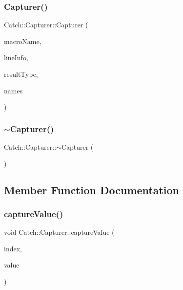 \subsubsection{Capturer()}
{\footnotesize\ttfamily Catch\+::\+Capturer\+::\+Capturer (\begin{DoxyParamCaption}\item[{\textbf{ String\+Ref}}]{macro\+Name,  }\item[{\textbf{ Source\+Line\+Info} const \&}]{line\+Info,  }\item[{\textbf{ Result\+Was\+::\+Of\+Type}}]{result\+Type,  }\item[{\textbf{ String\+Ref}}]{names }\end{DoxyParamCaption})}

\mbox{\label{class_catch_1_1_capturer_aecde85cf69e65565cec91e325a657b82}} 
\subsubsection{$\sim$Capturer()}
{\footnotesize\ttfamily Catch\+::\+Capturer\+::$\sim$\+Capturer (\begin{DoxyParamCaption}{ }\end{DoxyParamCaption})}



\subsection{Member Function Documentation}
\mbox{\label{class_catch_1_1_capturer_a0695ebf77f7cdcb344c73bcb3d9131e4}} 
\subsubsection{captureValue()}
{\footnotesize\ttfamily void Catch\+::\+Capturer\+::capture\+Value (\begin{DoxyParamCaption}\item[{size\+\_\+t}]{index,  }\item[{std\+::string const \&}]{value }\end{DoxyParamCaption})}

\mbox{\label{class_catch_1_1_capturer_a60d08e6db2e54740bb2298bbbec3bc0b}} 
